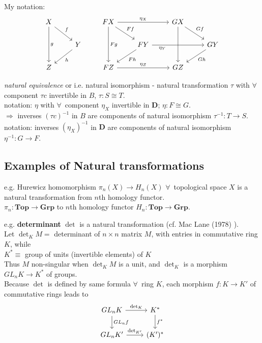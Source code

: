 My notation:
\[
\begin{gathered}
\begin{tikzcd}
X \arrow{dr}{f} \arrow{dd}{g} & \\
& Y \arrow{dl}{h} \\ 
Z & 
\end{tikzcd} \qquad \,
\begin{tikzcd}
FX \arrow{dr}{Ff} \arrow{dd}{Fg} \arrow{rr}{\eta_X} & & GX \arrow[dd, crossing over]{} \arrow{dr}{Gf} &  \\
& FY \arrow{dl}{Fh} \arrow{rr}[swap, pos=0.2]{\eta_Y} & & GY \arrow{dl}{Gh} \\ 
FZ \arrow{rr}{\eta_Z} & & GZ & 
\end{tikzcd} 
\end{gathered}
\]

\emph{natural equivalence} or i.e. natural isomorphism - natural transformation $\tau$ with $\forall \, $ component $\tau c$ invertible in $B$, $\tau : S \cong T$.  \\
notation: $\eta$ with $\forall \, $ component $\eta_X$ invertible in $\mathbf{D}$; $\eta : F \cong G$. \\
$\Longrightarrow $ inverses $(\tau c)^{-1}$ in $B$ are components of natural isomorphism $\tau^{-1} :T \to S$. \\
notation: inverses $(\eta_X)^{-1}$ in $\mathbf{D}$ are components of natural isomorphism $\eta^{-1}: G\to F$. 


\subsection{Examples of Natural transformations}

e.g. Hurewicz homomorphism $\pi_n(X) \to H_n(X)$ $\forall \, $ topological space $X$ is a natural transformation from $n$th homology functor. \\
$\pi_n : \textbf{Top} \to \mathbf{Grp}$ to $n$th homology functor $H_n : \textbf{Top} \to \textbf{Grp}$.

e.g. \textbf{determinant} $\det$ is a natural transformation (cf. Mac Lane (1978) \cite{agat:MacL1978}). \\
Let $\det_KM = $ determinant of $n\times n$ matrix $M$, with entries in commutative ring $K$, while \\
$K^* \equiv $ group of units (invertible elements) of $K$ \\

Thus $M$ non-singular when $\det_KM$ is a unit, and $\det_K$ is a morphism $GL_nK \to K^*$ of groups. \\
Because $\det$ is defined by same formula $\forall \,$ ring $K$, each morphism $f: K \to K'$ of commutative rings leads to 
\[
\begin{tikzcd}
GL_nK \arrow{d}{GL_nf} \arrow{r}{\det_K} & K^* \arrow{d}{f^*} \\
GL_nK' \arrow{r}{\det_{K'}} & (K')^*
\end{tikzcd}
\]

